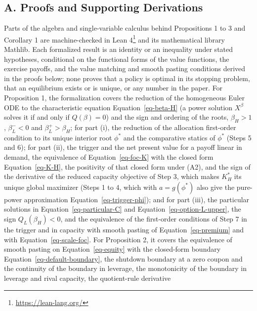 \documentclass[
  11pt,
  letterpaper,
]{scrartcl}
\newcounter{none} %
\begin{document}
\newpage

\subsection*{A. Proofs and Supporting
Derivations}\label{a.-proofs-and-supporting-derivations}

Parts of the algebra and single-variable calculus behind Propositions 1
to 3 and Corollary 1 are machine-checked in Lean 4\footnote{\url{https://lean-lang.org/}}
and its mathematical library Mathlib. Each formalized result is an
identity or an inequality under stated hypotheses, conditional on the
functional forms of the value functions, the exercise payoffs, and the
value matching and smooth pasting conditions derived in the proofs
below; none proves that a policy is optimal in its stopping problem,
that an equilibrium exists or is unique, or any number in the paper. For
Proposition 1, the formalization covers the reduction of the homogeneous
Euler ODE to the characteristic equation Equation~\ref{eq-beta-H} (a
power solution \(X^\beta\) solves it if and only if \(Q(\beta) = 0\))
and the sign and ordering of the roots, \(\beta_H > 1\),
\(\beta_L^- < 0\) and \(\beta_L^+ > \beta_H\); for part (i), the
reduction of the allocation first-order condition to its unique interior
root \(\phi^*\) and the comparative statics of \(\phi^*\) (Steps 5 and
6); for part (ii), the trigger and the net present value for a payoff
linear in demand, the equivalence of Equation~\ref{eq-foc-K} with the
closed form Equation~\ref{eq-K-H}, the positivity of that closed form
under (A2), and the sign of the derivative of the reduced capacity
objective of Step 3, which makes \(K_H^*\) its unique global maximizer
(Steps 1 to 4, which with \(a = g(\phi^*)\) also give the pure-power
approximation Equation~\ref{eq-trigger-phi}); and for part (iii), the
particular solutions in Equation~\ref{eq-particular-C} and
Equation~\ref{eq-option-L-upper}, the sign \(Q_L(\beta_H) < 0\), and the
equivalence of the first-order conditions of Step 7 in the trigger and
in capacity with smooth pasting of Equation~\ref{eq-premium} and with
Equation~\ref{eq-scale-foc}. For Proposition 2, it covers the
equivalence of smooth pasting on Equation~\ref{eq-equity} with the
closed-form boundary Equation~\ref{eq-default-boundary}, the shutdown
boundary at a zero coupon and the continuity of the boundary in
leverage, the monotonicity of the boundary in leverage and rival
capacity, the quotient-rule derivative
\end{document}
